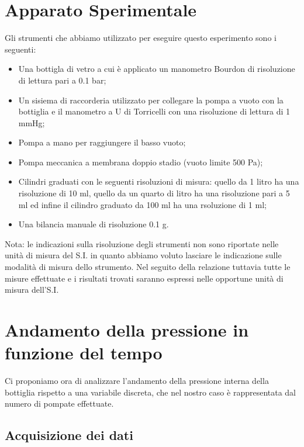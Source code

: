 \section{Apparato Sperimentale}

Gli strumenti che abbiamo utilizzato per eseguire questo esperimento sono i seguenti:
\begin{itemize}
	\item{Una bottigla di vetro a cui è applicato un manometro Bourdon di risoluzione di lettura pari a 0.1 bar;}
	\item{Un sisiema di raccorderia utilizzato per collegare la pompa a vuoto con la bottiglia e il manometro a U di Torricelli con una risoluzione di lettura di 1 mmHg;}
	\item{Pompa a mano per raggiungere il basso vuoto;}
	\item{Pompa meccanica a membrana doppio stadio (vuoto limite 500 Pa);}
	\item{Cilindri graduati con le seguenti risoluzioni di misura: quello da 1 litro ha una risoluzione di 10 ml, quello da un quarto di litro ha una risoluzione pari a 5 ml ed infine il cilindro graduato da 100 ml ha una rsoluzione di 1 ml;}
	\item{Una bilancia manuale di risoluzione 0.1 g.}
\end{itemize}
%
Nota: %
le indicazioni sulla risoluzione degli strumenti non sono riportate nelle unità di misura del S.I. %
in quanto abbiamo voluto lasciare le indicazione sulle modalità di misura dello strumento. Nel seguito della relazione tuttavia tutte le misure effettuate e i risultati trovati saranno espressi nelle opportune unità di misura dell'S.I.

\section{Andamento della pressione in funzione del tempo}

Ci proponiamo ora di analizzare l'andamento della pressione interna della bottiglia rispetto a una variabile discreta, che nel nostro caso è rappresentata dal numero di pompate effettuate.

\subsection{Acquisizione dei dati}

